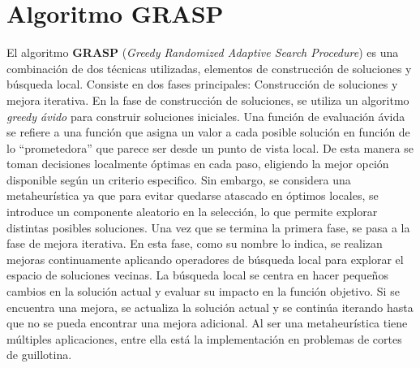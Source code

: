             \section{Algoritmo GRASP}
                El algoritmo \textbf{GRASP} (\textit{Greedy Randomized Adaptive Search Procedure}) es una combinación de dos técnicas utilizadas, elementos de construcción de soluciones y búsqueda local. Consiste en dos fases principales: Construcción de soluciones y mejora iterativa. 
                \newline
                \newline
                En la fase de construcción de soluciones, se utiliza un algoritmo \textit{greedy ávido} para construir soluciones iniciales.  Una función de evaluación ávida se refiere a una función que asigna un valor a cada posible solución en función de lo ``prometedora'' que parece ser desde un punto de vista local.            
                \newline
                \newline
                De esta manera se toman decisiones localmente óptimas en cada paso, eligiendo la mejor opción disponible según un criterio especifico. Sin embargo, se considera una metaheurística ya que para evitar quedarse atascado en óptimos locales, se introduce un componente aleatorio en la selección, lo que permite explorar distintas posibles soluciones. 
                \newline
                \newline                                  
                Una vez que se termina la primera fase, se pasa a la fase de mejora iterativa. En esta fase, como su nombre lo indica, se realizan mejoras continuamente aplicando operadores de búsqueda local para explorar el espacio de soluciones vecinas.  
                \newline
                \newline
                La búsqueda local se centra en hacer pequeños cambios en la solución actual y evaluar su impacto en la función objetivo. Si se encuentra una mejora, se actualiza la solución actual y se continúa iterando hasta que no se pueda encontrar una mejora adicional.  
                \newline
                \newline
                Al ser una metaheurística tiene múltiples aplicaciones, entre ella está la implementación en problemas de cortes de guillotina. 
                \newline
